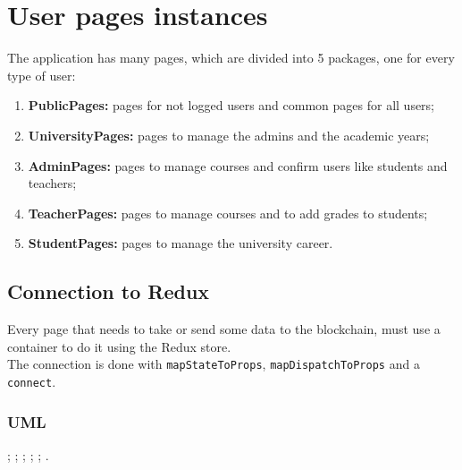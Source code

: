 \documentclass[../react]{subfiles}
\begin{document}
	
	\section{User pages instances}
	The application has many pages, which are divided into 5 packages, one for every type of user:
	\begin{enumerate}
		\item \textbf{PublicPages: } pages for not logged users and common pages for all users;
		\item \textbf{UniversityPages: } pages to manage the admins and the academic years;
		\item \textbf{AdminPages: } pages to manage courses and confirm users like students and teachers;
		\item \textbf{TeacherPages: } pages to manage courses and to add grades to students;
		\item \textbf{StudentPages: } pages to manage the university career.
	\end{enumerate}

	\subsection{Connection to Redux}
	Every page that needs to take or send some data to the blockchain, must use a container to do it using the Redux store.\\
	The connection is done with \texttt{mapStateToProps}, \texttt{mapDispatchToProps} and a \texttt{connect}.\\

	\subsubsection{UML}
	;
	;
	;
	;
	;
	.
\end{document}
